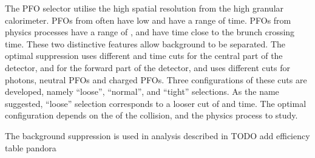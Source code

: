 The PFO selector utilise the high spatial resolution from the high granular calorimeter. PFOs from \ggHad often have low \pT and have a range of time. PFOs from physics processes have a range of \pT, and have time close to the brunch crossing time. These two distinctive features allow \ggHad background to be separated. The optimal suppression uses different \pT and time cuts for the central part of the detector, and for the forward part of the detector, and uses different cuts for photons, neutral PFOs and charged PFOs. Three configurations of these cuts are developed, namely ``loose'', ``normal'', and ``tight'' selections. As the name suggested, ``loose'' selection corresponds to a looser cut of \pT and time. The optimal configuration depends on the \sqrtS of the collision, and the physics process to study.

The background suppression is used in analysis described in 
TODO add efficiency table pandora 